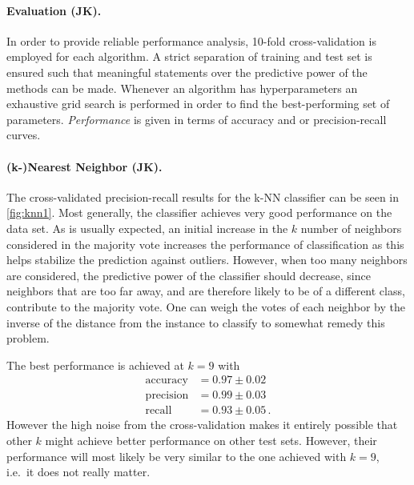 \documentclass[12pt, a4paper]{scrartcl}
\begin{document}
\paragraph{Evaluation (JK).} In order to provide reliable performance analysis, 10-fold cross-validation is employed for each algorithm. A strict separation of training and test set is ensured such that meaningful statements over the predictive power of the methods can be made.
Whenever an algorithm has hyperparameters an exhaustive grid search is performed in order to find the best-performing set of parameters. \emph{Performance} is given in terms of accuracy and or precision-recall curves. 

\paragraph{(k-)Nearest Neighbor (JK).} The cross-validated precision-recall results for the k-NN classifier can be seen in \cref{fig:knn1}. Most generally, the classifier achieves very good performance on the data set.
As is usually expected, an initial increase in the $k$ number of neighbors considered in the majority vote increases the performance of classification as this helps stabilize the prediction against outliers. However, when too many neighbors are considered, the predictive power of the classifier should decrease, since neighbors that are too far away, and are therefore likely to be of a different class, contribute to the majority vote. One can weigh the votes of each neighbor by the inverse of the distance from the instance to classify to somewhat remedy this problem.

The best performance is achieved at $k=9$ with 
\begin{align*}
	\text{accuracy} &= 0.97 \pm 0.02 \\
	\text{precision} &= 0.99 \pm 0.03 \\
	\text{recall} &= 0.93 \pm 0.05 \, .
\end{align*}
However the high noise from the cross-validation makes it entirely possible that other $k$ might achieve better performance on other test sets. However, their performance will most likely be very similar to the one achieved with $k=9$, i.e.\  it does not really matter.
\end{document}
